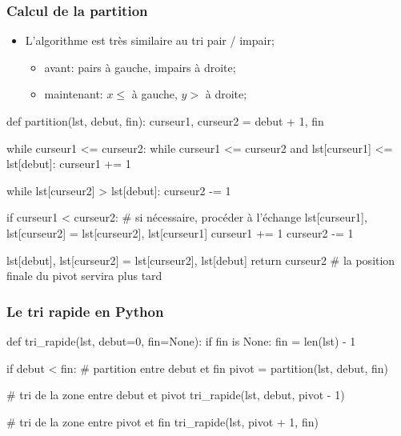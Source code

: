 \documentclass[12pt]{linfo-beamer}
\begin{document}

\begin{frame}[fragile]
    \frametitle{Calcul de la partition}
\begin{itemize}
    \item L'algorithme est très similaire au tri pair / impair;
    \begin{itemize}
        \item avant: pairs à gauche, impairs à droite;
        \item maintenant: $x\leq$  à gauche, $y>$  à droite;
    \end{itemize}
\end{itemize}
\scriptsize
\begin{pyframe}{}
def partition(lst, debut, fin):
    curseur1, curseur2 = debut + 1, fin

    while curseur1 <= curseur2:
        while curseur1 <= curseur2 and lst[curseur1] <= lst[debut]:
            curseur1 += 1

        while lst[curseur2] > lst[debut]:
            curseur2 -= 1

        if curseur1 < curseur2:  # si nécessaire, procéder à l'échange
            lst[curseur1], lst[curseur2] = lst[curseur2], lst[curseur1]
            curseur1 += 1
            curseur2 -= 1

    lst[debut], lst[curseur2] = lst[curseur2], lst[debut]
    return curseur2  # la position finale du pivot servira plus tard
\end{pyframe}

\end{frame}


\begin{frame}[fragile]
\frametitle{Le tri rapide en Python}

\footnotesize
\begin{pyframe}{}
def tri_rapide(lst, debut=0, fin=None):
    if fin is None:
        fin = len(lst) - 1

    if debut < fin:
        # partition entre debut et fin
        pivot = partition(lst, debut, fin)

        # tri de la zone entre debut et pivot
        tri_rapide(lst, debut, pivot - 1)

        # tri de la zone entre pivot et fin
        tri_rapide(lst, pivot + 1, fin)
\end{pyframe}
\end{frame}
\end{document}
